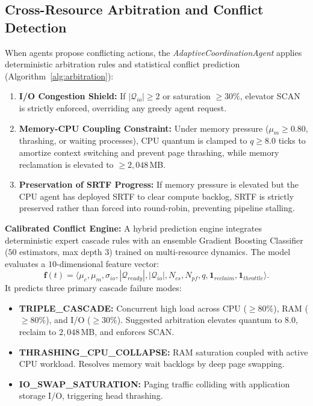 \documentclass[conference]{IEEEtran}
\begin{document}
\subsection{Cross-Resource Arbitration and Conflict Detection}
When agents propose conflicting actions, the \textit{AdaptiveCoordinationAgent} applies deterministic arbitration rules and statistical conflict prediction (Algorithm~\ref{alg:arbitration}):
\begin{enumerate}
    \item \textbf{I/O Congestion Shield:} If $|\mathcal{Q}_{io}| \ge 2$ or saturation $\ge 30\%$, elevator SCAN is strictly enforced, overriding any greedy agent request.
    \item \textbf{Memory-CPU Coupling Constraint:} Under memory pressure ($\mu_m \ge 0.80$, thrashing, or waiting processes), CPU quantum is clamped to $q \ge 8.0$ ticks to amortize context switching and prevent page thrashing, while memory reclamation is elevated to $\ge 2,048$\,MB.
    \item \textbf{Preservation of SRTF Progress:} If memory pressure is elevated but the CPU agent has deployed SRTF to clear compute backlog, SRTF is strictly preserved rather than forced into round-robin, preventing pipeline stalling.
\end{enumerate}

\noindent\textbf{Calibrated Conflict Engine:} A hybrid prediction engine integrates deterministic expert cascade rules with an ensemble Gradient Boosting Classifier ($50$ estimators, max depth $3$) trained on multi-resource dynamics. The model evaluates a $10$-dimensional feature vector:
\begin{equation}
    \mathbf{f}(t) = \langle \mu_c, \mu_m, \sigma_{io}, |\mathcal{Q}_{ready}|, |\mathcal{Q}_{io}|, N_{cs}, N_{pf}, q, \mathbf{1}_{reclaim}, \mathbf{1}_{throttle} \rangle.
\end{equation}
It predicts three primary cascade failure modes:
\begin{itemize}
    \item \textbf{TRIPLE\_CASCADE:} Concurrent high load across CPU ($\ge 80\%$), RAM ($\ge 80\%$), and I/O ($\ge 30\%$). Suggested arbitration elevates quantum to $8.0$, reclaim to $2,048$\,MB, and enforces SCAN.
    \item \textbf{THRASHING\_CPU\_COLLAPSE:} RAM saturation coupled with active CPU workload. Resolves memory wait backlogs by deep page swapping.
    \item \textbf{IO\_SWAP\_SATURATION:} Paging traffic colliding with application storage I/O, triggering head thrashing.
\end{itemize}
\end{document}

